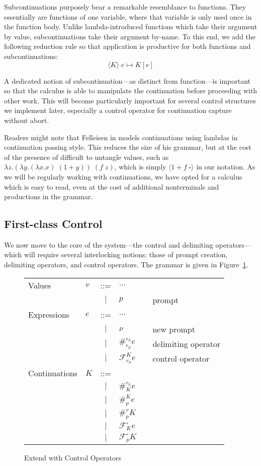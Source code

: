 \documentclass[11pt]{article}
\newcommand{\maybePage}{\null}
\newcommand\x{\lambda x}
\newcommand\F{\mathcal{F}}
\newcommand{\angles}[1]{\langle#1\rangle}
\begin{document}
Subcontinuations purposely bear a remarkable resemblance to functions.
They essentially are functions of one variable, where that variable is only used once in the function body.
Unlike lambda-introduced functions which take their argument by value, subcontinuations take their argument by-name.
To this end, we add the following reduction rule so that application is productive for both functions and subcontinuations:
$$\angles{K}\;e \mapsto K[e]$$

A dedicated notion of subcontinuation---as distinct from function---is important so that the calculus is able to manipulate the continuation before proceeding with other work.
This will become particularly important for several control structures we implement later, especially a control operator for continuation capture without abort.

Readers might note that Felleisen in \cite{PromptApplication} models continuations using lambdas in continuation passing style.
This reduces the size of his grammar, but at the cost of the presence of difficult to untangle values, such as $\lambda z.(\lambda y.(\x.x)\;(1+y))\;(f\;z)$, which is simply $\angles{1 + f\;\square}$ in our notation.
As we will be regularly working with continuations, we have opted for a calculus which is easy to read, even at the cost of additional nonterminals and productions in the grammar.


\maybePage
\subsection{First-class Control}

We now move to the core of the system---the control and delimiting operators---which will require several interlocking notions:
those of prompt creation, delimiting operators, and control operators.
The grammar is given in Figure~\ref{fig:addControl}.

\begin{figure}[H]
\caption{Extend with Control Operators}
\label{fig:addControl}

\begin{tabular}{llclll}
Values & $v$ & ::= & $\ldots$ \\
& & $|$ & $p$ && prompt \\
Expressions & $e$ & ::= & $\ldots$ \\
& & $|$ & $\nu$ && new prompt \\
& & $|$ & $\#_{e_p}^{e_h}e$ && delimiting operator \\
& & $|$ & $\F_{e_p}^Ke$ && control operator \\
Continuations & $K$ & ::= & \\
& & $|$ & $\#_{K}^{e_h}e$ &&  \\
& & $|$ & $\#_{p}^{K}e$ &&  \\
& & $|$ & $\#_{p}^{v}K$ &&  \\
& & $|$ & $\F_{K}^{\square}e$ &&  \\
& & $|$ & $\F_{p}^{\square}K$ &&  \\
\end{tabular}
\end{figure}
\end{document}
